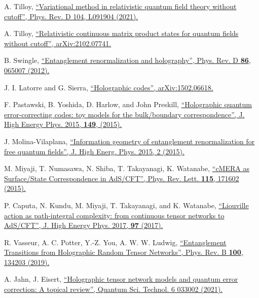 \documentclass[a4paper,preprintnumbers,nofootinbib,twocolumn]{quantumarticle}
\begin{document}
\begin{thebibliography}{99}
A. Tilloy,
\href{https://doi.org/10.1103/PhysRevD.104.L091904}{
``Variational method in relativistic quantum field theory without cutoff'',
Phys. Rev. D 104, L091904 (2021).
}

A. Tilloy,
\href{https://arxiv.org/abs/2102.07741}{
``Relativistic continuous matrix product states for quantum fields without cutoff'',
arXiv:2102.07741.
}




  B. Swingle,
\href{https://doi.org/10.1103/PhysRevD.86.065007}{
``Entanglement renormalization and holography'',
Phys. Rev. D {\bf 86}, 065007 (2012).
}

 J. I. Latorre and G. Sierra, 
\href{https://arxiv.org/abs/1502.06618}{
``Holographic codes'', arXiv:1502.06618.
}

  F.  Pastawski, B.  Yoshida, D.  Harlow, and John Preskill,
\href{https://doi.org/10.1007/JHEP06(2015)149}{
``Holographic quantum error-correcting codes: toy models for the bulk/boundary correspondence'',
J. High Energy Phys. 2015,  {\bf 149},   (2015).
}

  J. Molina-Vilaplana,
\href{https://doi.org/10.1007/JHEP09(2015)002}{
``Information geometry of entanglement renormalization for free quantum fields'',
J. High Energ. Phys. 2015, 2 (2015).
}

  M. Miyaji, T. Numasawa, N. Shiba, T. Takayanagi, K. Watanabe,
\href{https://doi.org/10.1103/PhysRevLett.115.171602}{
``cMERA as Surface/State Correspondence in AdS/CFT'',
Phys. Rev. Lett. {\bf 115}, 171602 (2015). 
}

  P.  Caputa, N.  Kundu, M.  Miyaji, T.  Takayanagi, and K.  Watanabe,
\href{https://doi.org/10.1007/JHEP11(2017)097}{
``Liouville action as path-integral complexity: from continuous tensor networks to AdS/CFT'',
J. High Energy Phys. 2017, {\bf 97}  (2017).
}

 R.  Vasseur, A.  C. Potter, Y.-Z.  You, A. W. W. Ludwig,
\href{https://doi.org/10.1103/PhysRevB.100.134203}{
``Entanglement Transitions from Holographic Random Tensor Networks'',
 Phys. Rev. B {\bf 100}, 134203 (2019). 
}

 A.  Jahn, J. Eisert, 
\href{https://doi.org/10.1088/2058-9565/ac0293}{
``Holographic tensor network models and quantum error correction: A topical review'',
Quantum Sci. Technol. 6 033002 (2021).
}


\end{thebibliography}
\end{document}
